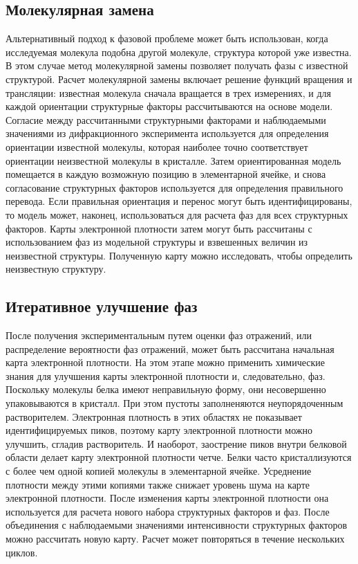 \documentclass{article}
\begin{document}
\subsection{Молекулярная замена}
Альтернативный подход к фазовой проблеме может быть использован, когда исследуемая молекула подобна другой молекуле, структура которой уже известна. В этом случае метод молекулярной замены\cite{MolReplMethod} позволяет получать фазы с известной структурой. Расчет молекулярной замены включает решение функций вращения и трансляции: известная молекула сначала вращается в трех измерениях, и для каждой ориентации структурные факторы рассчитываются на основе модели. Согласие между рассчитанными структурными факторами и наблюдаемыми значениями из дифракционного эксперимента используется для определения ориентации известной молекулы, которая наиболее точно соответствует ориентации неизвестной молекулы в кристалле. Затем ориентированная модель помещается в каждую возможную позицию в элементарной ячейке, и снова согласование структурных факторов используется для определения правильного перевода. Если правильная ориентация и перенос могут быть идентифицированы, то модель может, наконец, использоваться для расчета фаз для всех структурных факторов. Карты электронной плотности затем могут быть рассчитаны с использованием фаз из модельной структуры и взвешенных величин из неизвестной структуры. Полученную карту можно исследовать, чтобы определить неизвестную структуру.
\subsection{Итеративное улучшение фаз}
После получения экспериментальным путем оценки фаз отражений, или распределение вероятности фаз отражений, может быть рассчитана начальная карта электронной плотности. На этом этапе можно применить химические знания для улучшения карты электронной плотности и, следовательно, фаз. Поскольку молекулы белка имеют неправильную форму, они несовершенно упаковываются в кристалл. При этом пустоты заполненяются неупорядоченным растворителем. Электронная плотность в этих областях не показывает идентифицируемых пиков, поэтому карту электронной плотности можно улучшить, сгладив растворитель\cite{Wang1985}. И наоборот, заострение пиков внутри белковой области делает карту электронной плотности четче. Белки часто кристаллизуются с более чем одной копией молекулы в элементарной ячейке. Усреднение плотности между этими копиями также снижает уровень шума на карте электронной плотности. После изменения карты электронной плотности она используется для расчета нового набора структурных факторов и фаз. После объединения с наблюдаемыми значениями интенсивности структурных факторов можно рассчитать новую карту. Расчет может повторяться в течение нескольких циклов.
\end{document}
